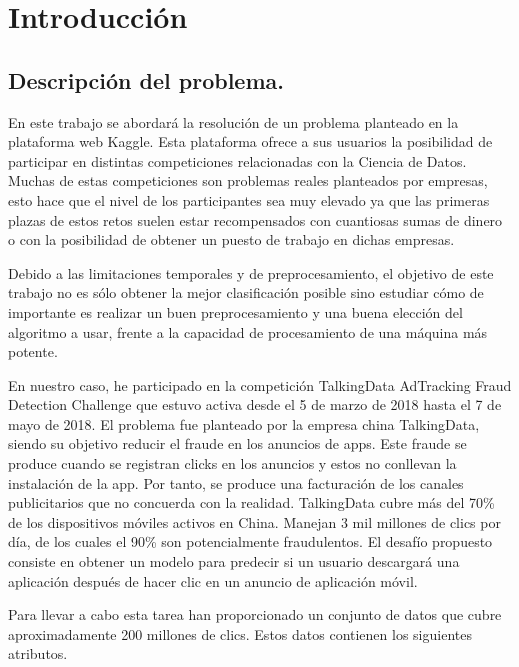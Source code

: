 \chapter[Introducción]{Introducción}
\section{Descripción del problema.}
En este trabajo se abordará la resolución de un problema planteado en la plataforma web Kaggle. Esta plataforma ofrece a sus usuarios la posibilidad de participar en distintas competiciones relacionadas con la Ciencia de Datos. Muchas de estas competiciones son problemas reales planteados por empresas, esto hace que el nivel de los participantes sea muy elevado ya que las primeras plazas de estos retos suelen estar recompensados con cuantiosas sumas de dinero o con la posibilidad de obtener un puesto de trabajo en dichas empresas.

Debido a las limitaciones temporales y de preprocesamiento, el objetivo de este trabajo no es sólo obtener la mejor clasificación posible sino estudiar cómo de importante es realizar un buen preprocesamiento y una buena elección del algoritmo a usar, frente a la capacidad de procesamiento de una máquina más potente.

En nuestro caso, he participado en la competición TalkingData AdTracking Fraud Detection Challenge que estuvo activa desde el 5 de marzo de 2018 hasta el 7 de mayo de 2018. El problema fue planteado por la empresa china TalkingData, siendo su objetivo reducir el fraude en los anuncios de apps. Este fraude se produce cuando se registran clicks en los anuncios y estos no conllevan la instalación de la app. Por tanto, se produce una facturación de los canales publicitarios que no concuerda con la realidad.
TalkingData	cubre más del 70\% de los dispositivos móviles activos en China. Manejan 3 mil millones de clics por día, de los cuales el 90\% son potencialmente fraudulentos. El desafío propuesto consiste en obtener un modelo para predecir si un usuario descargará una aplicación después de hacer clic en un anuncio de aplicación móvil.

Para llevar a cabo esta tarea han proporcionado un conjunto de datos que cubre aproximadamente 200 millones de clics. Estos datos contienen los siguientes atributos.

